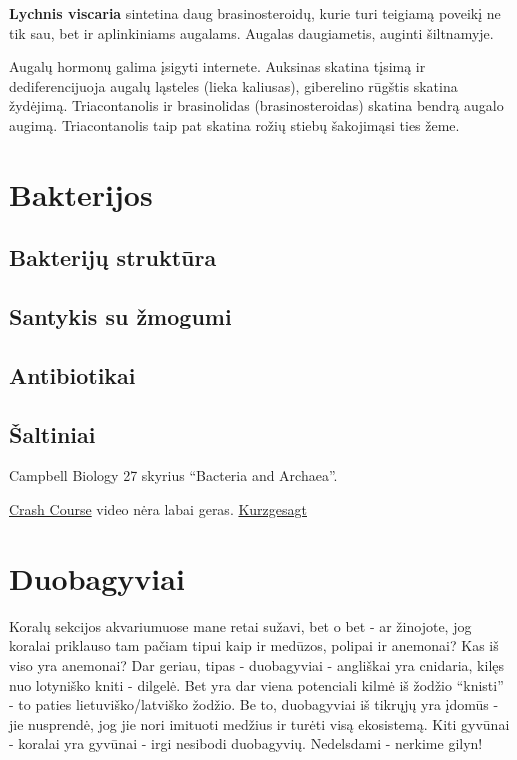 \documentclass[]{book}
\begin{document}
\textbf{Lychnis viscaria} sintetina daug brasinosteroidų, kurie turi teigiamą poveikį ne tik sau, bet ir aplinkiniams augalams. Augalas daugiametis, auginti šiltnamyje.

Augalų hormonų galima įsigyti internete. Auksinas skatina tįsimą ir dediferencijuoja augalų ląsteles (lieka kaliusas), giberelino rūgštis skatina žydėjimą. Triacontanolis ir brasinolidas (brasinosteroidas) skatina bendrą augalo augimą. Triacontanolis taip pat skatina rožių stiebų šakojimąsi ties žeme.

\hypertarget{bakterijos}{%
\chapter{Bakterijos}\label{bakterijos}}

\hypertarget{bakteriju-struktura}{%
\section{Bakterijų struktūra}\label{bakteriju-struktura}}

\hypertarget{santykis-su-zmogumi}{%
\section{Santykis su žmogumi}\label{santykis-su-zmogumi}}

\hypertarget{antibiotikai}{%
\section{Antibiotikai}\label{antibiotikai}}

\hypertarget{saltiniai}{%
\section{Šaltiniai}\label{saltiniai}}

Campbell Biology 27 skyrius ``Bacteria and Archaea''.

\href{https://www.youtube.com/watch?v=vAR47-g6tlA}{Crash Course} video nėra labai geras.
\href{https://www.youtube.com/watch?v=VzPD009qTN4}{Kurzgesagt}

\hypertarget{duobagyviai}{%
\chapter{Duobagyviai}\label{duobagyviai}}

Koralų sekcijos akvariumuose mane retai sužavi, bet o bet - ar žinojote, jog koralai priklauso tam pačiam tipui kaip ir medūzos, polipai ir anemonai? Kas iš viso yra anemonai? Dar geriau, tipas - duobagyviai - angliškai yra cnidaria, kilęs nuo lotyniško kniti - dilgelė. Bet yra dar viena potenciali kilmė iš žodžio ``knisti'' - to paties lietuviško/latviško žodžio. Be to, duobagyviai iš tikrųjų yra įdomūs - jie nusprendė, jog jie nori imituoti medžius ir turėti visą ekosistemą. Kiti gyvūnai - koralai yra gyvūnai - irgi nesibodi duobagyvių. Nedelsdami - nerkime gilyn!
\end{document}
